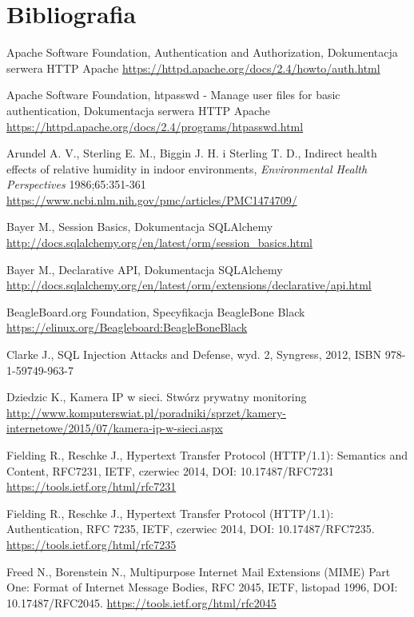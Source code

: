 \documentclass[a4paper,11pt,twoside]{article}
\begin{document}
\section{Bibliografia}
\begin{thebibliography}{9}

Apache Software Foundation, Authentication and Authorization, Dokumentacja serwera HTTP Apache
\url{https://httpd.apache.org/docs/2.4/howto/auth.html}

Apache Software Foundation, htpasswd - Manage user files for basic authentication, Dokumentacja serwera HTTP Apache
\url{https://httpd.apache.org/docs/2.4/programs/htpasswd.html}

Arundel A. V., Sterling E. M., Biggin J. H. i Sterling T. D., Indirect health effects of relative humidity in indoor environments, \textit{Environmental Health Perspectives} 1986;65:351-361
\url{https://www.ncbi.nlm.nih.gov/pmc/articles/PMC1474709/}

Bayer M., Session Basics, Dokumentacja SQLAlchemy
\url{http://docs.sqlalchemy.org/en/latest/orm/session_basics.html}

Bayer M., Declarative API, Dokumentacja SQLAlchemy
\url{http://docs.sqlalchemy.org/en/latest/orm/extensions/declarative/api.html}

BeagleBoard.org Foundation, Specyfikacja BeagleBone Black
\url{https://elinux.org/Beagleboard:BeagleBoneBlack}

Clarke J., SQL Injection Attacks and Defense, wyd. 2, Syngress, 2012, ISBN 978-1-59749-963-7  

Dziedzic K., Kamera IP w sieci. Stwórz prywatny monitoring
\url{http://www.komputerswiat.pl/poradniki/sprzet/kamery-internetowe/2015/07/kamera-ip-w-sieci.aspx}

Fielding R., Reschke J., Hypertext Transfer Protocol (HTTP/1.1): Semantics and Content, RFC7231, IETF, czerwiec 2014, DOI: 10.17487/RFC7231
\url{https://tools.ietf.org/html/rfc7231}

Fielding R., Reschke J., Hypertext Transfer Protocol (HTTP/1.1): Authentication, RFC 7235, IETF, czerwiec 2014, DOI: 10.17487/RFC7235.
\url{https://tools.ietf.org/html/rfc7235}

Freed N., Borenstein N., Multipurpose Internet Mail Extensions (MIME) Part One: Format of Internet Message Bodies, RFC 2045, IETF, listopad 1996, DOI: 10.17487/RFC2045.
\url{https://tools.ietf.org/html/rfc2045}


\end{thebibliography}
\end{document}
